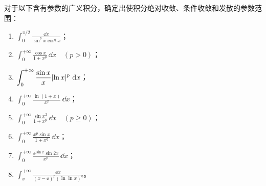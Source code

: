 \begin{xexercise}[2]
对于以下含有参数的广义积分，确定出使积分绝对收敛、条件收敛和发散的参数范围：
  \begin{enumerate}[label=(\arabic*)]
    \item $\displaystyle\int_0^{\pi/2}\frac{\dd x}{\sin^p x\cos^q x}$；
    \item $\displaystyle\int_0^{+\infty}\frac{\cos x}{1+x^p}\,\dd x\quad(p>0)$；
    \item $\displaystyle\int_0^{+\infty}\frac{\sin x}{x}\lvert\ln x\rvert^p\,\mathop{}\!\mathrm{d} x$；
    \item $\displaystyle\int_0^{+\infty}\frac{\ln(1+x)}{x^p}\,\dd x$；
    \item $\displaystyle\int_0^{+\infty}\frac{\sin x^2}{1+x^p}\,\dd x\quad(p\geq0)$；
    \item $\displaystyle\int_0^{+\infty}\frac{x^p\sin x}{1+x^q}\,\dd x$；
    \item $\displaystyle\int_0^{+\infty}\frac{\ee^{\sin x}\sin2x}{x^p}\,\dd x$；
    \item $\displaystyle\int_{\ee}^{+\infty}\frac{\dd x}{(x-\ee)^p(\ln\ln x)^q}$。
  \end{enumerate}
\end{xexercise}
